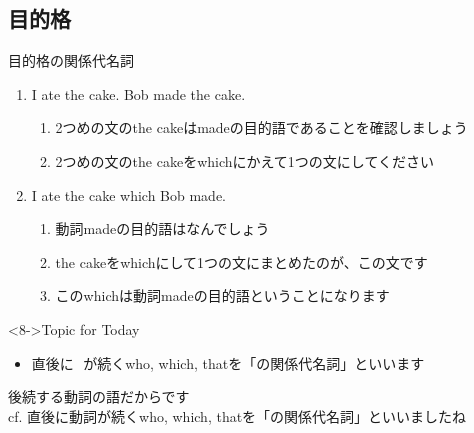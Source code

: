 \documentclass[aspectratio=169,xcolor={dvipsnames,table}]{beamer}
\begin{document}
\subsection{目的格}
\begin{frame}[plain,t]{目的格の関係代名詞}

\begin{enumerate}
 \item<1-> I ate the cake. Bob made the cake.
       \begin{enumerate}
	\item<2-> 2つめの文のthe cakeはmadeの目的語であることを確認しましょう
	\item<3-> 2つめの文のthe cakeをwhichにかえて1つの文にしてください
       \end{enumerate}
 \item<4-> I ate the cake which Bob made.
       \begin{enumerate}
	\item<5-> 動詞madeの目的語はなんでしょう
	\item<6-> the cakeをwhichにして1つの文にまとめたのが、この文です
	\item<7-> このwhichは動詞madeの目的語ということになります
       \end{enumerate}
\end{enumerate}

\vspace{30pt}

\begin{block}<8->{Topic for Today}
\small
\begin{itemize}[square]
 \item 直後に\,\,\,\,が続くwho, which, thatを「の関係代名詞」といいます
\end{itemize}
\hfill{}{\scriptsize 後続する動詞の語だからです}\\
\hfill{}{\scriptsize cf. 直後に動詞が続くwho, which, thatを「の関係代名詞」といいましたね}
     \end{block}
\end{frame}
\end{document}

